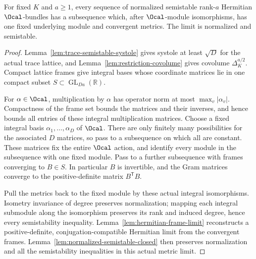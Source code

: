 \begin{lemma}
\label{lem:arithmetic-compactness}
\leanok
{}
For fixed $K$ and $a\geq1$, every sequence of normalized semistable
rank-$a$ Hermitian $\Ocal$-bundles has a subsequence which, after
$\Ocal$-module isomorphisms, has one fixed underlying module and
convergent metrics. The limit is normalized and semistable.
\end{lemma}
\begin{proof}
Lemma~\ref{lem:trace-semistable-systole} gives systole at least $\sqrt D$
for the actual trace lattice, and Lemma~\ref{lem:restriction-covolume}
gives covolume $\Delta_K^{a/2}$. Compact lattice frames give integral bases
whose coordinate matrices lie in one compact subset
$S\subset\operatorname{GL}_{Da}(\mathbb R)$.

For $\alpha\in\Ocal$, multiplication by $\alpha$ has operator norm at
most $\max_v|\alpha_v|$. Compactness of the frame set bounds the
matrices and their inverses, and hence bounds all entries
of these integral multiplication matrices. Choose a fixed integral
basis $\alpha_1,\ldots,\alpha_D$ of $\Ocal$. There are only finitely
many possibilities for the associated $D$ matrices, so pass to a
subsequence on which all are constant. These matrices fix the entire
$\Ocal$ action, and identify every module in the subsequence with one
fixed module. Pass to a further subsequence with frames converging to
$B\in S$. In particular $B$ is invertible, and the Gram matrices
converge to the positive-definite matrix $B^{\mathsf T}B$.

Pull the metrics back to the fixed module by these actual integral
isomorphisms. Isometry invariance of degree preserves normalization;
mapping each integral submodule along the isomorphism preserves its
rank and induced degree, hence every semistability inequality.
Lemma~\ref{lem:hermitian-frame-limit} reconstructs a positive-definite,
conjugation-compatible Hermitian limit from the convergent frames.
Lemma~\ref{lem:normalized-semistable-closed} then preserves normalization
and all the semistability inequalities in this actual metric limit.
\end{proof}

